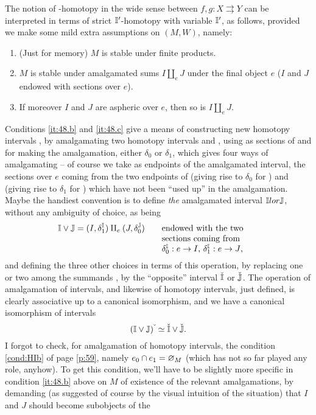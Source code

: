 The notion of \bI-homotopy in the wide sense between
$f,g:X\rightrightarrows Y$ can be interpreted in terms of strict
${\mathbb{I}}'$-homotopy with variable ${\mathbb{I}}'$, as follows, provided we make
some mild extra assumptions on $(M,W)$, namely:
\begin{enumerate}[label=\alph*)]
\item\label{it:48.a}
  (Just for memory) $M$ is stable under finite products.
\item\label{it:48.b}
  $M$ is stable under amalgamated sums $I \amalg_e J$ under the final
  object $e$ ($I$ and $J$ endowed with sections over $e$).
\item\label{it:48.c}
  If moreover $I$ and $J$ are aspheric over $e$, then so is $I\amalg_e J$.
\end{enumerate}

Conditions \ref{it:48.b} and \ref{it:48.c} give a means of
constructing new homotopy intervals \bK, by amalgamating two homotopy
intervals \bI{} and \bJ, using as sections of \bI{} and \bJ{} for
making the amalgamation, either $\delta_0$ or $\delta_1$, which gives
four ways of amalgamating -- of course we take as endpoints of the
amalgamated interval, the sections over $e$ coming from the two
endpoints of \bI{} (giving rise to $\delta_0$ for \bK) and \bJ{}
(giving rise to $\delta_1$ for \bK) which have not been ``used up'' in
the amalgamation. Maybe the handiest convention is to define
\emph{the} amalgamated interval ${\mathbb{I}} lor {\mathbb{J}}$, without any ambiguity
of choice, as being
\[ \bI \lor \bJ = (I,\delta_1^\bI) \amalg_e
(J,\delta_0^\bJ)\qquad
\parbox[t]{0.33\textwidth}{\raggedright endowed with the two
  sections coming from $\delta_0^\bI:e\to I$, $\delta_1^\bI:e\to
  J$,}\]
and defining the three other choices in terms of this operation, by
replacing one or two among the summands \bI, \bJ{} by the ``opposite''
interval $\check{{\mathbb{I}}}$ or $\check{{\mathbb{J}}}$. The operation of amalgamation of
intervals, and likewise of homotopy intervals, just defined, is
clearly associative up to a canonical isomorphism, and we have a
canonical isomorphism of intervals
\[ ({\mathbb{I}}\lor {\ensuremath{\mathbb{J}}})\check{\phantom{\mathrm i}} \simeq \check{{\mathbb{I}}} \lor \check{{\mathbb{J}}}.\]
I forgot to check, for amalgamation of homotopy intervals, the
condition \ref{cond:HIb} of page \ref{p:59}, namely $e_0 \mathbin{\cap} e_1 =
\varnothing_M$ (which has not so far played any role, anyhow). To get
this condition, we'll have to be slightly more specific in condition
\ref{it:48.b} above on $M$ of existence of the relevant amalgamations,
by demanding (as suggested of course by the visual intuition of the
situation) that $I$ and $J$ should become subobjects of the
